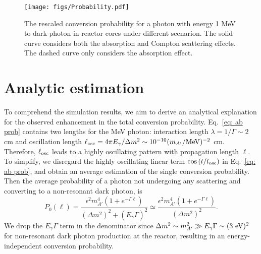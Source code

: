 \documentclass[prd,showpacs,preprintnumbers,amsmath,amssymb,twocolumn,superscriptaddress,notitlepage]{revtex4-2}
\begin{document}
\begin{figure}[htbp]
\begin{centering} 
\texttt{[image: figs/Probability.pdf]}
\caption{The rescaled conversion probability
for a photon with energy
1 MeV to dark photon
in reactor cores
under different scenarion.
The solid curve considers both the absorption and
Compton scattering effects.
The dashed curve only considers
the absorption effect.
}
\label{fig:probability}
\end{centering}
\end{figure}




\section{Analytic estimation}

To comprehend the simulation results, we aim to derive an analytical explanation for the observed enhancement in the total conversion probability.
Eq.~\eqref{eq: ab prob} contains two lengths for the MeV photon: 
interaction length $\lambda = 1/\Gamma \sim 2$ cm 
and oscillation length $ \ell_{\rm osc} = 4 \pi E_\gamma / \Delta m^2 \sim 10^{-10}(m_{A'}/ \rm{MeV})^{-2}$ cm. 
Therefore, $\ell_{\rm osc}$ leads to a highly oscillating pattern with propagation length $\ell$. 
To simplify, we disregard the highly oscillating linear term $\cos{(l/l_{\rm osc})}$ in Eq.~\eqref{eq: ab prob}, 
and obtain an average estimation of the single conversion probability. 
Then the average probability 
of a photon not undergoing any scattering and converting to a  non-resonant dark photon, 
is
\begin{equation}
P_0(\ell)
= \frac{\epsilon^2 m_{A'}^4\left(1+e^{-\Gamma \ell}\right)}{\left(\Delta m^2\right)^2+(E_\gamma \Gamma)^2} 
\simeq \frac{\epsilon^2 m_{A'}^4\left(1+e^{-\Gamma \ell}\right)}{\left(\Delta m^2\right)^2}.
\label{eq: 0 sca P}
\end{equation}
We drop the $E_\gamma \Gamma$ term in the denominator since
$\Delta m^2 \sim m_{A'}^2 \gg E_\gamma \Gamma \sim (3 ~\rm{eV})^2$ 
for non-resonant dark photon production at the reactor,
resulting in an energy-independent conversion probability.
\end{document}

